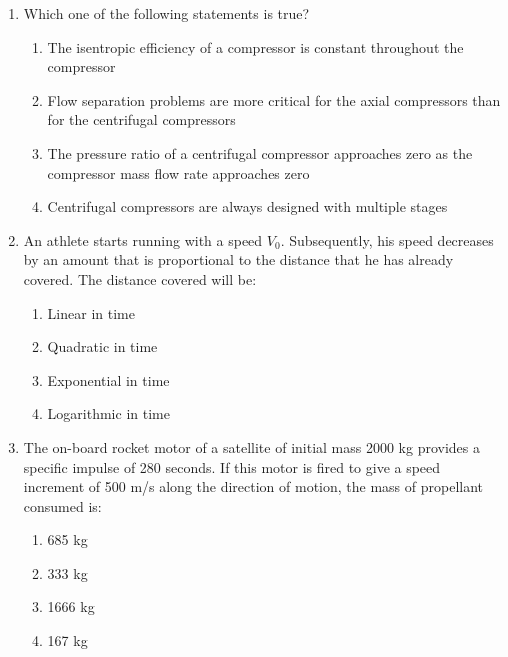 \documentclass[journal]{IEEEtran}
\numberwithin{equation}{enumi}
\numberwithin{figure}{enumi}
\begin{document}
\begin{enumerate}[start=35]
    \item Which one of the following statements is true?
    \begin{enumerate}
        \item The isentropic efficiency of a compressor is constant throughout the compressor
        \item Flow separation problems are more critical for the axial compressors than for the centrifugal compressors
        \item The pressure ratio of a centrifugal compressor approaches zero as the compressor mass flow rate approaches zero
        \item Centrifugal compressors are always designed with multiple stages
    \end{enumerate}

    \item An athlete starts running with a speed $V_0$. Subsequently, his speed decreases by an amount that is proportional to the distance that he has already covered. The distance covered will be:
    \begin{enumerate}
        \item Linear in time
        \item Quadratic in time
        \item Exponential in time
        \item Logarithmic in time
    \end{enumerate}

    \item The on-board rocket motor of a satellite of initial mass 2000 kg provides a specific impulse of 280 seconds. If this motor is fired to give a speed increment of 500 m/s along the direction of motion, the mass of propellant consumed is:
    \begin{enumerate}
        \item 685 kg
        \item 333 kg
        \item 1666 kg
        \item 167 kg
    \end{enumerate}
\end{enumerate}
\end{document}

